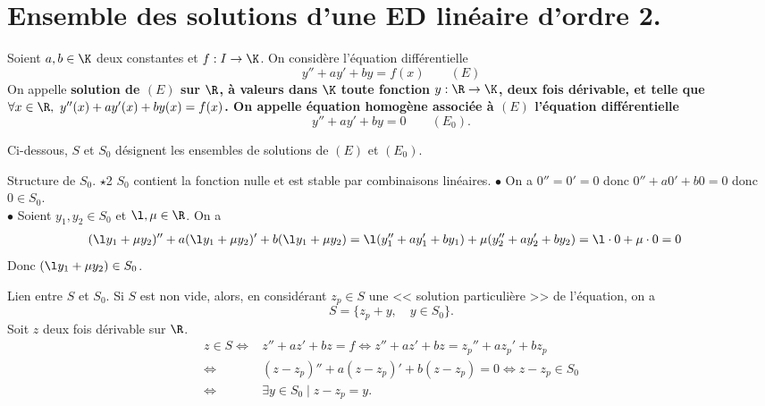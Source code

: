 \documentclass[11pt]{article}
\begin{document}


\renewcommand*{\0}{\mathbbm{0}}

\thispagestyle{fancy}

\section{Ensemble des solutions d'une ED linéaire d'ordre 2.}

\begin{defi}{}{}
    Soient $a,b\in\K$ deux constantes et $f:I\to\K$. On considère l'équation différentielle
    \begin{equation*}
        y'' + ay' + by = f(x) \qquad (E)
    \end{equation*}
    On appelle \bf{solution} de $(E)$ sur $\R$, à valeurs dans $\K$ toute fonction $y:\R\to\K$, deux fois dérivable, et telle que $\forall x \in \R, ~ y''(x)+ay'(x)+by(x)=f(x)$.\n
    On appelle \bf{équation homogène} associée à $(E)$ l'équation différentielle
    \begin{equation*}
        y'' + ay' + by = 0 \qquad (E_0).
    \end{equation*}
\end{defi}

Ci-dessous, $S$ et $S_0$ désignent les ensembles de solutions de $(E)$ et $(E_0)$.

\begin{prop}{Structure de $S_0$. $\star$}{2}
    $S_0$ contient la fonction nulle et est stable par combinaisons linéaires.
    \tcblower
    $\bullet$ On a $0''=0'=0$ donc $0''+a0'+b0=0$ donc $0\in S_0$.\\
    $\bullet$ Soient $y_1,y_2\in S_0$ et $\l,\mu\in\R$. On a
    \begin{align*}
        (\l y_1 + \mu y_2)''+a(\l y_1 + \mu y_2)' + b(\l y_1 + \mu y_2) &= \l(y_1'' + ay_1' + by_1) + \mu(y_2'' + ay_2' + by_2) = \l\cdot0 + \mu\cdot0=0
    \end{align*}
    Donc $(\l y_1 + \mu y_2)\in S_0$.
\end{prop}

\begin{prop}{Lien entre $S$ et $S_0$.}{}
    Si $S$ est non vide, alors, en considérant $z_p\in S$ une << solution particulière >> de l'équation, on a
    \begin{equation*}
        S=\{z_p + y, \quad y \in S_0\}.
    \end{equation*}
    \tcblower
    Soit $z$ deux fois dérivable sur $\R$.
    \begin{align*}
        z \in S \iff& z'' + az' + bz = f \iff z'' + az' + bz = z_p'' + az_p' + bz_p\\
        \iff& (z-z_p)''+a(z-z_p)' + b(z-z_p) = 0 \iff z-z_p \in S_0\\
        \iff& \exists y \in S_0 \mid z-z_p = y. 
    \end{align*}
\end{prop}
\end{document}
